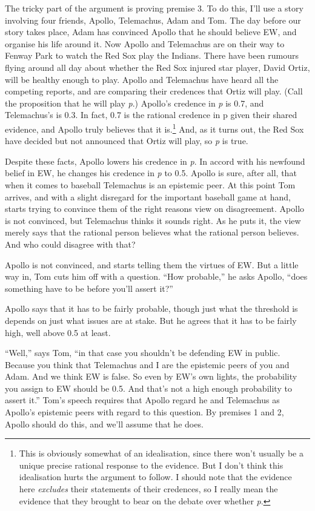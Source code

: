 \documentclass[
  10pt,
  letterpaper,
  DIV=11,
  numbers=noendperiod,
  twoside]{scrartcl}
\begin{document}
The tricky part of the argument is proving premise 3. To do this, I'll
use a story involving four friends, Apollo, Telemachus, Adam and Tom.
The day before our story takes place, Adam has convinced Apollo that he
should believe EW, and organise his life around it. Now Apollo and
Telemachus are on their way to Fenway Park to watch the Red Sox play the
Indians. There have been rumours flying around all day about whether the
Red Sox injured star player, David Ortiz, will be healthy enough to
play. Apollo and Telemachus have heard all the competing reports, and
are comparing their credences that Ortiz will play. (Call the
proposition that he will play \emph{p}.) Apollo's credence in \emph{p}
is 0.7, and Telemachus's is 0.3. In fact, 0.7 is the rational credence
in p given their shared evidence, and Apollo truly believes that it
is.\footnote{This is obviously somewhat of an idealisation, since there
  won't usually be a unique precise rational response to the evidence.
  But I don't think this idealisation hurts the argument to follow. I
  should note that the evidence here \emph{excludes} their statements of
  their credences, so I really mean the evidence that they brought to
  bear on the debate over whether \emph{p}.} And, as it turns out, the
Red Sox have decided but not announced that Ortiz will play, so \emph{p}
is true.

Despite these facts, Apollo lowers his credence in \emph{p}. In accord
with his newfound belief in EW, he changes his credence in \emph{p} to
0.5. Apollo is sure, after all, that when it comes to baseball
Telemachus is an epistemic peer. At this point Tom arrives, and with a
slight disregard for the important baseball game at hand, starts trying
to convince them of the right reasons view on disagreement. Apollo is
not convinced, but Telemachus thinks it sounds right. As he puts it, the
view merely says that the rational person believes what the rational
person believes. And who could disagree with that?

Apollo is not convinced, and starts telling them the virtues of EW. But
a little way in, Tom cuts him off with a question. ``How probable,'' he
asks Apollo, ``does something have to be before you'll assert it?''

Apollo says that it has to be fairly probable, though just what the
threshold is depends on just what issues are at stake. But he agrees
that it has to be fairly high, well above 0.5 at least.

``Well,'' says Tom, ``in that case you shouldn't be defending EW in
public. Because you think that Telemachus and I are the epistemic peers
of you and Adam. And we think EW is false. So even by EW's own lights,
the probability you assign to EW should be 0.5. And that's not a high
enough probability to assert it.'' Tom's speech requires that Apollo
regard he and Telemachus as Apollo's epistemic peers with regard to this
question. By premises 1 and 2, Apollo should do this, and we'll assume
that he does.
\end{document}
